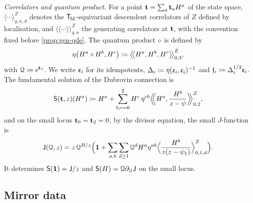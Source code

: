 \emph{Correlators and quantum product.} For a point $\mathbf{t}=\sum_a\mathbf{t}_aH^a$ of the state space, $\langle\cdots\rangle_{g,n,d}^Z$ denotes the $\mathsf{T}_{\!\mathrm{M}}$-equivariant descendent correlators of $Z$ defined by localisation, and $\langle\!\langle\cdots\rangle\!\rangle_{g,n}^Z$ the generating correlators at $\mathbf{t}$, with the convention fixed before \cref{prop:gen-qde}. The quantum product $\circ$ is defined by
\begin{equation}
\label{eq:set-qprod}
\eta\big(H^a\circ H^b,H^c\big)\coloneqq\big\langle\!\big\langle H^a,H^b,H^c\big\rangle\!\big\rangle_{0,3}^Z,
\end{equation}
with $\mathcal{Q}\coloneqq\mathrm{e}^{\mathbf{t}_1}$. We write $\mathfrak{e}_i$ for its idempotents, $\Delta_i\coloneqq\eta(\mathfrak{e}_i,\mathfrak{e}_i)^{-1}$ and $\mathfrak{f}_i\coloneqq\Delta_i^{1/2}\mathfrak{e}_i$. The fundamental solution of the Dubrovin connection is
\begin{equation}
\label{eq:set-fundsol}
\mathsf{S}(\mathbf{t},z)(H^a)\coloneqq H^a+\sum_{b,c=0}^{2}H^c\,\eta^{cb}\Big\langle\!\!\Big\langle H^a,\frac{H^b}{z-\psi}\Big\rangle\!\!\Big\rangle_{0,2}^Z,
\end{equation}
and on the small locus $\mathbf{t}_0=\mathbf{t}_2=0$, by the divisor equation, the small $J$-function is
\begin{equation}
\label{eq:set-J}
\mathsf{J}(\mathcal{Q},z)=z\,\mathcal{Q}^{H/z}\Big(\mathbf{1}+\sum_{a,b}\sum_{d\geq1}\mathcal{Q}^dH^a\eta^{ab}\Big\langle\frac{H^b}{z(z-\psi_1)}\Big\rangle_{0,1,d}^Z\Big).
\end{equation}
It determines $\mathsf{S}(\mathbf{1})=\mathsf{J}/z$ and $\mathsf{S}(H)=\mathcal{Q}\partial_{\mathcal{Q}}\mathsf{J}$ on the small locus. 

\subsection{Mirror data}
\label{sec:set-mirror}

